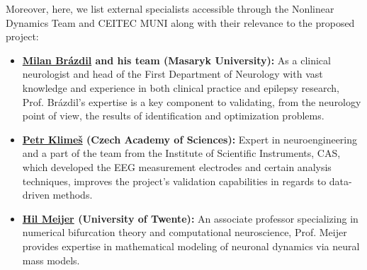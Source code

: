 \documentclass[a4paper,11pt]{scrartcl}
\begin{document}
Moreover, here, we list external specialists accessible through the Nonlinear Dynamics Team and CEITEC MUNI along with their relevance to the proposed project:
\begin{itemize}
    \item \textbf{\href{https://orcid.org/0000-0001-7979-2343}{Milan Brázdil} and his team (Masaryk University):} As a clinical neurologist and head of the First Department of Neurology with vast knowledge and experience in both clinical practice and epilepsy research, Prof. Brázdil's expertise is a key component to validating, from the neurology point of view, the results of identification and optimization problems.
    \item \textbf{\href{https://orcid.org/0000-0002-0232-9518}{Petr Klimeš} (Czech Academy of Sciences):} Expert in neuroengineering and a part of the team from the Institute of Scientific Instruments, CAS, which developed the EEG measurement electrodes and certain analysis techniques, improves the project's validation capabilities in regards to data-driven methods.
    \item \textbf{\href{https://orcid.org/0000-0003-1526-3762}{Hil Meijer} (University of Twente):} An associate professor specializing in numerical bifurcation theory and computational neuroscience, Prof. Meijer provides expertise in mathematical modeling of neuronal dynamics via neural mass models.
\end{itemize}


\end{document}
